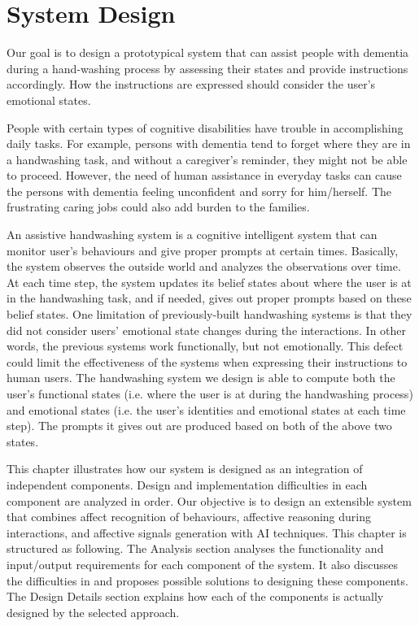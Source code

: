 \chapter{System Design}
\label{chap:design}

Our goal is to design a prototypical system that can assist people with dementia during a hand-washing process by assessing their states and provide instructions accordingly. How the instructions are expressed should consider the user's emotional states.

People with certain types of cognitive disabilities have trouble in accomplishing daily tasks. For example, persons with dementia tend to forget where they are in a handwashing task, and without a caregiver's reminder, they might not be able to proceed. However, the need of human assistance in everyday tasks can cause the persons with dementia feeling unconfident and sorry for him/herself. The frustrating caring jobs could also add burden to the families.

An assistive handwashing system is a cognitive intelligent system that can monitor user's behaviours and give proper prompts at certain times. Basically, the system observes the outside world and analyzes the observations over time. At each time step, the system updates its belief states about where the user is at in the handwashing task, and if needed, gives out proper prompts based on these belief states. One limitation of previously-built handwashing systems is that they did not consider users' emotional state changes during the interactions. In other words, the previous systems work functionally, but not emotionally. This defect could limit the effectiveness of the systems when expressing their instructions to human users. The handwashing system we design is able to compute both the user's functional states (i.e. where the user is at during the handwashing process) and emotional states (i.e. the user's identities and emotional states at each time step). The prompts it gives out are produced based on both of the above two states. 

This chapter illustrates how our system is designed as an integration of independent components. Design and implementation difficulties in each component are analyzed in order. Our objective is to design an extensible system that combines affect recognition of behaviours, affective reasoning during interactions, and affective signals generation with AI techniques. This chapter is structured as following. The Analysis section analyses the functionality and input/output requirements for each component of the system. It also discusses the difficulties in and proposes possible solutions to designing these components. The Design Details section explains how each of the components is actually designed by the selected approach.

